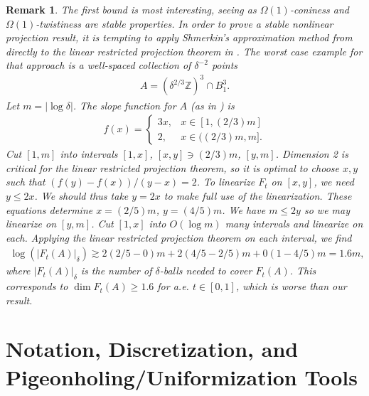 \documentclass[12pt]{amsart}
\numberwithin{equation}{section}
\newtheorem{remark}[lemma]{Remark}
\newcommand{\1}{\mathbbm{1}}
\begin{document}
\begin{remark}
    The first bound is most interesting, seeing as $\Omega(1)$-coniness and $\Omega(1)$-twistiness are stable properties. In order to prove a stable nonlinear projection result, it is tempting to apply Shmerkin's approximation method from \cite{shmerkinNonlinearBourgain} directly to the linear restricted projection theorem in \cite{ganRestrictedProjectionsPlanes}. The worst case example for that approach is a well-spaced collection of $\delta^{-2}$ points
\begin{align}
    A = (\delta^{2/3} \mathbb Z)^3 \cap B_1^3.
\end{align}
Let $m = |\log \delta|$. The slope function for $A$ (as in \cite{shmerkinNonlinearBourgain}) is 
\begin{align}
    f(x) = 
    \begin{cases}
        3x, & x \in [1,(2/3)m] \\
        2, & x \in ((2/3)m,m].
    \end{cases}
\end{align}
Cut $[1,m]$ into intervals $[1,x]$, $[x,y] \ni (2/3)m$, $[y,m]$. Dimension 2 is critical for the linear restricted projection theorem, so it is optimal to choose $x,y$ such that $(f(y) - f(x))/(y-x) = 2$. To linearize $F_t$ on $[x,y]$, we need $y \leq 2x$. We should thus take $y = 2x$ to make full use of the linearization. These equations determine $x = (2/5)m$, $y=(4/5)m$. We have $m \leq 2y$ so we may linearize on $[y,m]$. Cut $[1,x]$ into $O(\log m)$ many intervals and linearize on each. Applying the linear restricted projection theorem on each interval, we find
\begin{align}
    \log(|F_t(A)|_\delta) \gtrsim 2 (2/5 - 0)m + 2(4/5 - 2/5)m + 0(1-4/5)m = 1.6m,
\end{align}
where $|F_t(A)|_\delta$ is the number of $\delta$-balls needed to cover $F_t(A)$.
This corresponds to $\dim F_t(A) \geq 1.6$ for a.e. $t \in [0,1]$, which is worse than our result. 
\end{remark}


\section{Notation, Discretization, and Pigeonholing/Uniformization Tools}\label{sec: 3}
\end{document}

